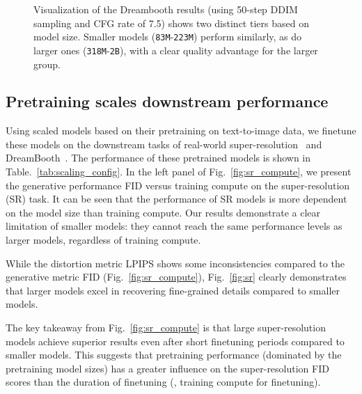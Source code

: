 \begin{figure}[!ht]
\begin{tabular}[t]{c c c c c}
    \end{tabular}
    \caption{
    Visualization of the Dreambooth results (using 50-step DDIM sampling and CFG rate of 7.5) shows two distinct tiers based on model size.  Smaller models (\texttt{83M}-\texttt{223M}) perform similarly, as do larger ones (\texttt{318M}-\texttt{2B}),  with a clear quality advantage for the larger group.
    }
    \label{fig:dreambooth}
\end{figure}

\subsection{Pretraining scales downstream performance}
\label{sec:scalingsr}
Using scaled models based on their pretraining on text-to-image data, we finetune these models on the downstream tasks of real-world super-resolution~\cite{saharia2022image, sahak2023denoising} and DreamBooth~\cite{ruiz2023dreambooth}.
The performance of these pretrained models is shown in Table.~\ref{tab:scaling_config}.
In the left panel of Fig.~\ref{fig:sr_compute}, we present the generative performance FID versus training compute on the super-resolution (SR) task.
It can be seen that the performance of SR models is more dependent on the model size than training compute.
Our results demonstrate a clear limitation of smaller models: they cannot reach the same performance levels as larger models, regardless of training compute.

While the distortion metric LPIPS shows some inconsistencies compared to the generative metric FID (Fig.~\ref{fig:sr_compute}), Fig.~\ref{fig:sr} clearly demonstrates that larger models excel in recovering fine-grained details compared to smaller models.

The key takeaway from Fig.~\ref{fig:sr_compute} is that large super-resolution models achieve superior results even after short finetuning periods compared to smaller models. This suggests that pretraining performance (dominated by the pretraining model sizes) has a greater influence on the super-resolution FID scores than the duration of finetuning (\ie, training compute for finetuning).


